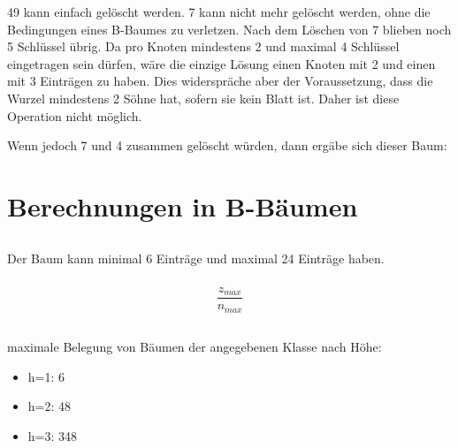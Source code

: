 \documentclass[ngerman]{gdb-aufgabenblatt}
\begin{document}
		
		49 kann einfach gelöscht werden. 7 kann nicht mehr gelöscht werden, ohne die Bedingungen eines B-Baumes zu verletzen. Nach dem Löschen von 7 blieben noch 5 Schlüssel übrig. Da pro Knoten mindestens 2 und maximal 4 Schlüssel eingetragen sein dürfen, wäre die einzige Lösung einen Knoten mit 2 und einen mit 3 Einträgen zu haben. Dies widerspräche aber der Voraussetzung, dass die Wurzel mindestens 2 Söhne hat, sofern sie kein Blatt ist. Daher ist diese Operation nicht möglich.
		
		Wenn jedoch 7 und 4 zusammen gelöscht würden, dann ergäbe sich dieser Baum:
		
\section{Berechnungen in B-Bäumen}
	\subsection{} %
		\subsubsection{} %
			Der Baum kann minimal 6 Einträge und maximal 24 Einträge haben.
		\subsubsection{} %
			\[
				\frac{z_{max}}{n_{max}}
			\]
	\subsection{} %
		\subsubsection{} %
			maximale Belegung von Bäumen der angegebenen Klasse nach Höhe:
			
			\begin{itemize}
				\item h=1: 6
				\item h=2: 48
				\item h=3: 348
			\end{itemize}
			
\end{document}
